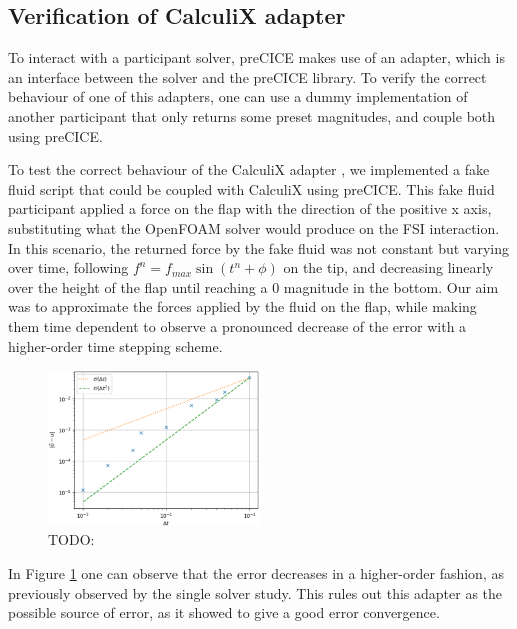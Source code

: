 \documentclass[
  english,        %
  font=times,     %
  onecolumn,      %
]{tumarticle}
\begin{document}
\subsection{Verification of CalculiX adapter}
To interact with a participant solver, preCICE makes use of an adapter, which is an interface between the solver and the preCICE library. To verify the correct behaviour of one of this adapters, one can use a dummy implementation of another participant that only returns some preset magnitudes, and couple both using preCICE.

To test the correct behaviour of the CalculiX adapter \cite{yau2016conjugate}, we implemented a fake fluid script that could be coupled with CalculiX using preCICE. This fake fluid participant applied a force on the flap with the direction of the positive x axis, substituting what the OpenFOAM solver would produce on the FSI interaction. In this scenario, the returned force by the fake fluid was not constant but varying over time, following $f^n = f_{max} \sin(t^n + \phi)$ on the tip, and decreasing linearly over the height of the flap until reaching a 0 magnitude in the bottom. Our aim was to approximate the forces applied by the fluid on the flap, while making them time dependent to observe a pronounced decrease of the error with a higher-order time stepping scheme.

\begin{figure}[!ht]
    \centering
    \includegraphics[width=0.5\textwidth]{resources/fake_fluid.png}
    \caption{TODO: }
    \label{fig:fake-fluid}
\end{figure}

In Figure \ref{fig:fake-fluid} one can observe that the error decreases in a higher-order fashion, as previously observed by the single solver study. This rules out this adapter as the possible source of error, as it showed to give a good error convergence.
\end{document}
